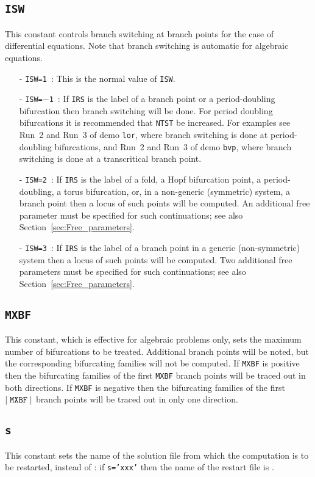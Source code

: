 \documentclass[12pt]{report}
\def\abs#1{\mid#1\mid}
\begin{document}
\subsection{\texttt{ISW}}  \label{sec:ISW}
 This constant controls branch switching at branch points for the case
 of differential equations.
 Note that branch switching is automatic for algebraic equations.
\begin{itemize}
\item[-] {\tt ISW=1}~: This is the normal value of {\tt ISW}.
\item[-] {\tt ISW=$-$1}~:
  If {\tt IRS} is the label of a branch point or a period-doubling
  bifurcation then branch switching will be done.
  For period doubling bifurcations it is recommended that {\tt NTST} be increased.
  For examples see Run~2 and Run~3 of demo {\tt lor}, where branch switching
  is done at period-doubling bifurcations, and Run~2 and Run~3 of demo {\tt bvp},
  where branch switching is done at a transcritical branch point.
\item[-] {\tt ISW=2}~:
  If {\tt IRS} is the label of a fold, a Hopf bifurcation point, 
  a period-doubling, a torus bifurcation, or, in a non-generic
  (symmetric) system, a branch point then a locus of such points will be
  computed. An additional free parameter must be specified for such 
  continuations; see also Section~\ref{sec:Free_parameters}.
\item[-] {\tt ISW=3}~:
  If {\tt IRS} is the label of a branch point in a generic
  (non-symmetric) system then a locus of such points will be
  computed. Two additional free parameters must be specified for such 
  continuations; see also Section~\ref{sec:Free_parameters}.
\end{itemize}

\subsection{\texttt{MXBF}}  \label{sec:MXBF}
 This constant, which is effective for algebraic problems only,
 sets the maximum number of bifurcations to be treated.
 Additional branch points will be noted, but the corresponding bifurcating
 families will not be computed.
 If {\tt MXBF} is positive then the bifurcating families of the first {\tt MXBF}
  branch points will be traced out in both directions.
 If {\tt MXBF} is negative then the bifurcating families of the first 
 $\abs{{\tt MXBF}}$ branch points will be traced out in only one direction. 

\subsection{\texttt{s}}  \label{sec:s}
This constant sets the name of the solution file from which the computation
is to be restarted, instead of : if {\tt s='xxx'} then the
name of the restart file is .
\end{document}
